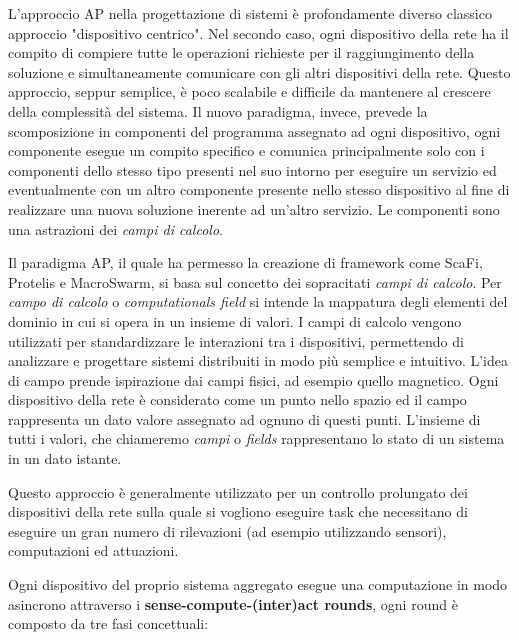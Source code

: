 \documentclass[12pt,a4paper,openright,twoside]{book}
\begin{document}
L'approccio \ac{AP} nella progettazione di sistemi è profondamente diverso classico approccio "dispositivo centrico".
Nel secondo caso, ogni dispositivo della rete ha il compito di compiere tutte le operazioni richieste per il raggiungimento della soluzione e simultaneamente comunicare con gli altri dispositivi della rete. Questo approccio, seppur semplice, è poco scalabile e difficile da mantenere al crescere della complessità del sistema. 
Il nuovo paradigma, invece, prevede la scomposizione in componenti del programma assegnato ad ogni dispositivo, ogni componente esegue un compito specifico e comunica principalmente solo con i componenti dello stesso tipo presenti nel suo intorno per eseguire un servizio ed eventualmente con un altro componente presente nello stesso dispositivo al fine di realizzare una nuova soluzione inerente ad un'altro servizio. Le componenti sono una astrazioni dei \textit{campi di calcolo}.

Il paradigma \ac{AP}, il quale ha permesso la creazione di framework come ScaFi, Protelis e MacroSwarm, si basa sul concetto dei sopracitati \textit{campi di calcolo}. Per \textit{campo di calcolo} o \textit{computationals field} si intende la mappatura degli elementi del dominio in cui si opera in un insieme di valori.
I campi di calcolo vengono utilizzati per standardizzare le interazioni tra i dispositivi, permettendo di analizzare e progettare sistemi distribuiti in modo più semplice e intuitivo. L'idea di campo prende ispirazione dai campi fisici, ad esempio quello magnetico. Ogni dispositivo della rete è considerato come un punto nello spazio ed il campo rappresenta un dato valore assegnato ad ognuno di questi punti. L'insieme di tutti i valori, che chiameremo \textit{campi} o \textit{fields} rappresentano lo stato di un sistema in un dato istante.

Questo approccio è generalmente utilizzato per un controllo prolungato dei dispositivi della rete sulla quale si vogliono eseguire task che necessitano di eseguire un gran numero di rilevazioni (ad esempio utilizzando sensori), computazioni ed attuazioni.

Ogni dispositivo del proprio sistema aggregato esegue una computazione in modo asincrono attraverso i \textbf{sense-compute-(inter)act rounds}\label{sec:sense-compute-interact}, ogni round è composto da tre fasi concettuali:
\end{document}
